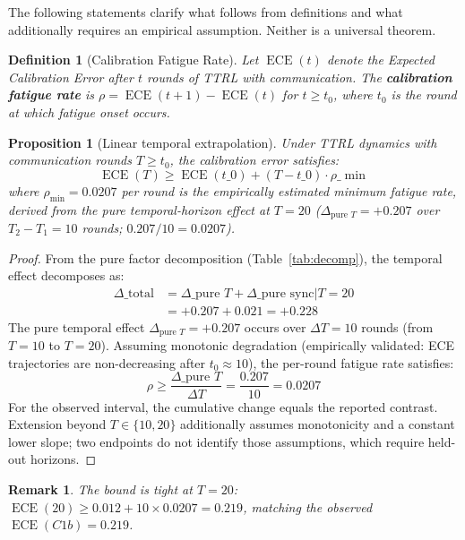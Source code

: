 \documentclass[11pt]{article}
\DeclareMathOperator{\ECE}{ECE}
\newtheorem{definition}{Definition}
\newtheorem{remark}{Remark}
\newtheorem{proposition}[theorem]{Proposition}
\begin{document}
The following statements clarify what follows from definitions and what additionally requires an empirical assumption. Neither is a universal theorem.

\begin{definition}[Calibration Fatigue Rate]
Let $\ECE(t)$ denote the Expected Calibration Error after $t$ rounds of TTRL with communication. The \textbf{calibration fatigue rate} is $\rho = \ECE(t+1) - \ECE(t)$ for $t \geq t_0$, where $t_0$ is the round at which fatigue onset occurs.
\end{definition}

\begin{proposition}[Linear temporal extrapolation]\label{thm:fatigue}
Under TTRL dynamics with communication rounds $T \geq t_0$, the calibration error satisfies:
\begin{equation}
    \ECE(T) \geq \ECE(t\_0) + (T - t\_0) \cdot \rho\_{\min}
\end{equation}
where $\rho_{\min} = 0.0207$ per round is the empirically estimated minimum fatigue rate, derived from the pure temporal-horizon effect at $T{=}20$ ($\Delta_{\text{pure } T} = +0.207$ over $T_2 - T_1 = 10$ rounds; $0.207/10 = 0.0207$).
\end{proposition}

\begin{proof}
From the pure factor decomposition (Table~\ref{tab:decomp}), the temporal effect decomposes as:
\begin{align}
    \Delta\_{\text{total}} &= \Delta\_{\text{pure } T} + \Delta\_{\text{pure sync}|T=20} \\
    &= +0.207 + 0.021 = +0.228
\end{align}
The pure temporal effect $\Delta_{\text{pure } T} = +0.207$ occurs over $\Delta T = 10$ rounds (from $T{=}10$ to $T{=}20$). Assuming monotonic degradation (empirically validated: ECE trajectories are non-decreasing after $t_0 \approx 10$), the per-round fatigue rate satisfies:
\begin{equation}
    \rho \geq \frac{\Delta\_{\text{pure } T}}{\Delta T} = \frac{0.207}{10} = 0.0207
\end{equation}
For the observed interval, the cumulative change equals the reported contrast. Extension beyond $T\in\{10,20\}$ additionally assumes monotonicity and a constant lower slope; two endpoints do not identify those assumptions, which require held-out horizons.
\end{proof}

\begin{remark}
The bound is tight at $T{=}20$: $\ECE(20) \geq 0.012 + 10 \times 0.0207 = 0.219$, matching the observed $\ECE(C1b) = 0.219$.
\end{remark}
\end{document}
